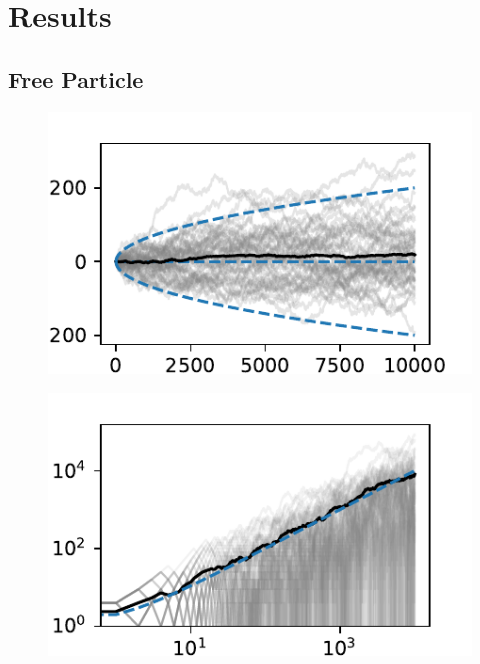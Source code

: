 \documentclass[
    parskip=half, 
    twoside=false,
    twocolumn=true,
    fontsize=11pt,
]{scrarticle}
\begin{document}
\section{Results}
\subsection{Free Particle}
\begin{figure}
\label{fig:pt1_trajectory}
\includegraphics{figures/01 time trace.pdf}
\end{figure}
\begin{figure}
\label{fig:pt1_msd}
\includegraphics{figures/01 msd.pdf}
\end{figure}

\end{document}
